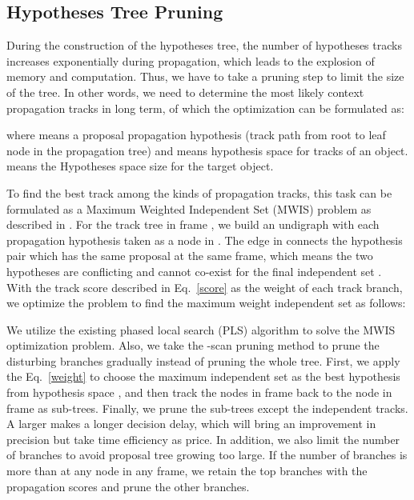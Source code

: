 \documentclass[10pt,twocolumn,letterpaper]{article}
\begin{document}
\subsection{Hypotheses Tree Pruning}
\label{tree_pruning}
\vspace{-5pt}

During the construction of the hypotheses tree, the number of hypotheses tracks increases exponentially during propagation, which leads to the explosion of memory and computation. Thus, we have to take a pruning step to limit the size of the tree. In other words, we need to determine the most likely context propagation tracks in long term, of which the optimization can be formulated as:

where  means a proposal propagation hypothesis (track path from root to leaf node in the propagation tree) and  means hypothesis space for tracks of an object.  means the Hypotheses space size for the target object.







To find the best track among the kinds of propagation tracks, this task can be formulated as a Maximum Weighted Independent Set (MWIS) problem as described in \cite{papageorgiou2009maximum}. For the track tree in frame , we build an undigraph  with each propagation hypothesis  taken as a node in . The edge  in  connects the hypothesis pair  which has the same proposal at the same frame, which means the two hypotheses are conflicting and cannot co-exist for the final independent set . With the track score described in Eq.~\eqref{score} as the weight  of each track branch, we optimize the problem to find the maximum weight independent set  as follows:


We utilize the existing phased local search (PLS) algorithm \cite{pullan2006phased,pullan2009optimisation,barth2016temporal} to solve the MWIS optimization problem. Also, we take the -scan pruning method to prune the disturbing branches gradually instead of pruning the whole tree. First, we apply the Eq.~\eqref{weight} to choose the maximum independent set as the best hypothesis from hypothesis space , and then track the nodes in frame  back to the node in frame  as sub-trees. Finally, we prune the sub-trees except the independent tracks.  A larger  makes a longer decision delay, which will bring an improvement in precision but take time efficiency as price. In addition, we also limit the number of branches to avoid proposal tree growing too large. If the number of branches is more than  at any node in any frame, we retain the top  branches with the propagation scores and prune the other branches.
\end{document}
